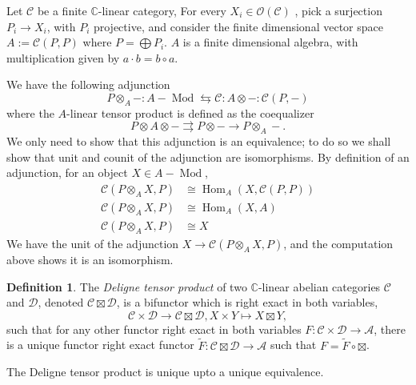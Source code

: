\documentclass[11pt]{book}
\theoremstyle{Rem}
\theoremstyle{definition}
\newtheorem{Def}[theorem]{Definition}
\numberwithin{equation}{section}
\newcommand\Hom{\operatorname{Hom}}
\newcommand\Mod{\operatorname{Mod}}
\newcommand\kk{\mathbb C}
\newcommand\C{\mathcal C}
\newcommand\OO{\mathcal O}
\newcommand\D{\mathcal D}
\newcommand\A{\mathcal A}
\newcommand{\ra}\rightarrow
\begin{document}
Let $\C$ be a finite $\kk$-linear category, For every $X_i\in \OO(\C)$ , pick a surjection $P_i\rightarrow X_i$,  with $P_i$ projective, and consider the finite dimensional vector space $A:=\C(P, P)$ where $P= \bigoplus P_i$. $A$ is a finite dimensional algebra, with multiplication given by $a\cdot b = b\circ a$.


We have the following adjunction \begin{equation}
P\otimes_A -:	A-\Mod \leftrightarrows \C : A\otimes - : \C(P, -)
\end{equation}
where the $A$-linear tensor product is defined as the coequalizer  \begin{equation}
	P \otimes A \otimes - \rightrightarrows P\otimes -\rightarrow P\otimes_A -.
\end{equation}
We only need to show that this adjunction is an equivalence; to do so we shall show that unit and counit of the adjunction are isomorphisms.
By definition of an adjunction, for an object $X\in A-\Mod$, \begin{align}
	\C(P\otimes_A X, P) &\cong \Hom _{A} (X, \C(P, P))\\
	\C(P \otimes_A X, P) &\cong \Hom_{A}(X, A) \\
	\C(P \otimes_A X, P) &\cong X
\end{align}
We have the unit of the adjunction $X\rightarrow \C(P \otimes_A X, P)$, and the computation above shows it is an isomorphism.
\fi 
\begin{Def}\rm
The \textit{Deligne tensor product} of two $\kk$-linear abelian categories $\C$ and $\D$, denoted $\C \boxtimes \D$, is a bifunctor which is right exact in both variables, \begin{equation}
	\C\times \D \ra \C \boxtimes \D, X\times Y \mapsto X\boxtimes Y, 
\end{equation} such that for any other functor right exact in both variables $F:\C\times \D \ra \A$, there is a unique functor right exact functor $\tilde{F}:\C\boxtimes \D\ra \A$ such that $ F= \tilde{F}\circ \boxtimes$.
\end{Def}
The Deligne tensor product is unique upto a unique equivalence.
\end{document}
